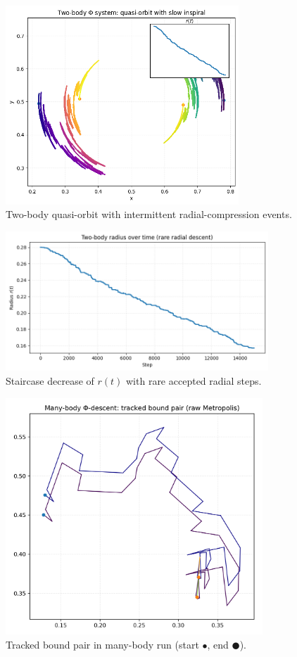 \documentclass[aps,preprint,onecolumn,longbibliography,nofootinbib]{revtex4-2}
\numberwithin{equation}{section}
\begin{document}
\begin{figure}[H]\centering\includegraphics[width=0.78\textwidth]{figures/orbit_two_body.png}\caption{Two-body quasi-orbit with intermittent radial-compression events.}\label{fig:twoorbit}\end{figure}
\begin{figure}[H]\centering\includegraphics[width=0.88\textwidth]{figures/two_body_r_vs_t.png}\caption{Staircase decrease of $r(t)$ with rare accepted radial steps.}\label{fig:tworadius}\end{figure}
\begin{figure}[H]\centering\includegraphics[width=0.86\textwidth]{figures/orbit_many_body.png}\caption{Tracked bound pair in many-body run (start $\bullet$, end $\CIRCLE$).}\label{fig:manypair}\end{figure}
\end{document}
